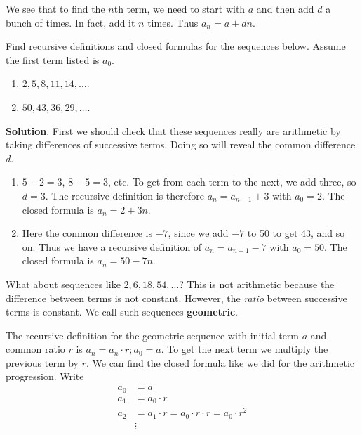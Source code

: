 \documentclass[11pt,]{book}
\newcommand{\terminology}[1]{\textbf{#1}}
\theoremstyle{ptxplainnotitle}
\theoremstyle{ptxplaintitle}
\theoremstyle{ptxdefinitionnotitle}
\theoremstyle{ptxdefinitiontitle}
\theoremstyle{ptxdefinitionnotitle}
\theoremstyle{ptxdefinitiontitle}
\theoremstyle{ptxdefinitionnotitle}
\theoremstyle{ptxdefinitiontitle}
\theoremstyle{ptxdefinitiontitlenonumber}
\theoremstyle{ptxdefinitiontitlenonumber}
\numberwithin{equation}{chapter}
\newcommand{\amp}{&}
\begin{document}
%
\par
\hypertarget{p-154}{}%
We see that to find the \(n\)th term, we need to start with \(a\) and then add \(d\) a bunch of times. In fact, add it \(n\) times. Thus \(a_n = a+dn\).%
\begin{example}\label{example-5}
\hypertarget{p-155}{}%
Find recursive definitions and closed formulas for the sequences below. Assume the first term listed is \(a_0\).%
\par
\hypertarget{p-156}{}%
\leavevmode%
\begin{enumerate}
\item\hypertarget{li-101}{}\(2, 5, 8, 11, 14, \ldots\).%
\item\hypertarget{li-102}{}\(50, 43, 36, 29, \ldots\).%
\end{enumerate}
%
\par\smallskip%
\noindent\textbf{Solution}.\hypertarget{solution-11}{}\quad%
\hypertarget{p-157}{}%
First we should check that these sequences really are arithmetic by taking differences of successive terms. Doing so will reveal the common difference \(d\).%
\par
\hypertarget{p-158}{}%
\leavevmode%
\begin{enumerate}
\item\hypertarget{li-103}{}\(5-2 = 3\), \(8-5 = 3\), etc. To get from each term to the next, we add three, so \(d = 3\). The recursive definition is therefore \(a_n = a_{n-1} + 3\) with \(a_0 = 2\). The closed formula is \(a_n = 2 + 3n\).%
\item\hypertarget{li-104}{}\hypertarget{p-159}{}%
Here the common difference is \(-7\), since we add \(-7\) to 50 to get 43, and so on. Thus we have a recursive definition of \(a_n = a_{n-1} - 7\) with \(a_0 = 50\). The closed formula is \(a_n = 50 - 7n\).%
\end{enumerate}
%
\end{example}
\hypertarget{p-160}{}%
What about sequences like \(2, 6, 18, 54, \ldots\)? This is not arithmetic because the difference between terms is not constant. However, the \emph{ratio} between successive terms is constant. We call such sequences \terminology{geometric}.%
\par
\hypertarget{p-161}{}%
The recursive definition for the geometric sequence with initial term \(a\) and common ratio \(r\) is \(a_n = a_{n}\cdot r; a_0 = a\). To get the next term we multiply the previous term by \(r\). We can find the closed formula like we did for the arithmetic progression. Write%
\begin{align*}
a_0 \amp = a\\
a_1 \amp = a_0\cdot r\\
a_2 \amp = a_1 \cdot r = a_0\cdot r\cdot r = a_0\cdot r^2\\
\amp \vdots 
\end{align*}
\end{document}
